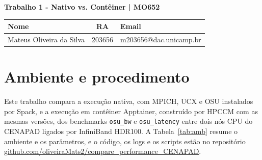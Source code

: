 \documentclass[Portugues]{ic-tese-v3}
\begin{document}
\paginasiniciais
\pagestyle{fancy}\fancyhf{}\fancyfoot[C]{\thepage}\renewcommand{\headrulewidth}{0pt}\thispagestyle{fancy}
\vspace{-16mm}
\begin{center}
{\large\textbf{Trabalho 1 - Nativo vs. Contêiner | MO652}}\\[2mm]
\small
\begin{tabular}{|l||c||l|}
 \hline
 Nome & RA & Email \\
 \hline\hline
 Mateus Oliveira da Silva & 203656 & m203656@dac.unicamp.br \\
 \hline
\end{tabular}
\end{center}

\section{Ambiente e procedimento}
Este trabalho compara a execução nativa, com MPICH, UCX e OSU instalados por Spack, e a execução em contêiner Apptainer, construído por HPCCM com as mesmas versões, dos benchmarks \texttt{osu\_bw} e \texttt{osu\_latency} entre dois nós CPU do CENAPAD ligados por InfiniBand HDR100. A Tabela~\ref{tab:amb} resume o ambiente e os parâmetros, e o código, os logs e os scripts estão no repositório \href{https://github.com/oliveiraMats2/compare_performance_CENAPAD}{github.com/\allowbreak oliveiraMats2/\allowbreak compare\_\allowbreak performance\_\allowbreak CENAPAD}.
\end{document}

